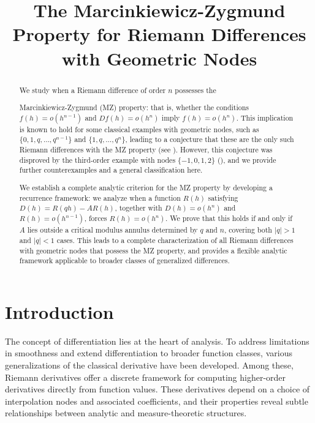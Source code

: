 \documentclass{raex}
\title{The Marcinkiewicz-Zygmund Property for Riemann Differences with Geometric Nodes}
\theoremstyle{definition}
\begin{document}
\maketitle
\begin{abstract}
We study when a Riemann difference of order \( n \) possesses the 

\noindent Marcinkiewicz-Zygmund (MZ) property: that is, whether the conditions \( f(h) = o(h^{n-1}) \) and \( Df(h) = o(h^n) \) imply \( f(h) = o(h^n) \). This implication is known to hold for some classical examples with geometric nodes, such as \( \{0, 1, q, \dots, q^{n-1}\} \) and \( \{1, q, \dots, q^n\} \), leading to a conjecture that these are the only such Riemann differences with the MZ property (see \cite{ACF1}). However, this conjecture was disproved by the third-order example with nodes \( \{-1, 0, 1, 2\} \) (\cite{CF2}), and we provide further counterexamples and a general classification here.

We establish a complete analytic criterion for the MZ property by developing a recurrence framework: we analyze when a function \( R(h) \) satisfying \( D(h) = R(qh) - A R(h) \), together with \( D(h) = o(h^n) \) and \( R(h) = o(h^{n-1}) \), forces \( R(h) = o(h^n) \). We prove that this holds if and only if \( A \) lies outside a critical modulus annulus determined by \( q \) and \( n \), covering both \( |q| > 1 \) and \( |q| < 1 \) cases. This leads to a complete characterization of all Riemann differences with geometric nodes that possess the MZ property, and provides a flexible analytic framework applicable to broader classes of generalized differences.
\end{abstract}


\maketitle

\section{Introduction}

The concept of differentiation lies at the heart of analysis. To address limitations in smoothness and extend differentiation to broader function classes, various generalizations of the classical derivative have been developed. Among these, Riemann derivatives offer a discrete framework for computing higher-order derivatives directly from function values. These derivatives depend on a choice of interpolation nodes and associated coefficients, and their properties reveal subtle relationships between analytic and measure-theoretic structures.
\end{document}
